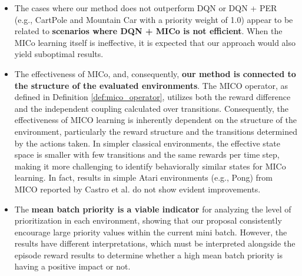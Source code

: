 \begin{itemize}    
    \item The cases where our method does not outperform DQN or DQN + PER (e.g., CartPole and Mountain Car with a priority weight of 1.0) appear to be related to \textbf{scenarios where DQN + MICo is not efficient}. When the MICo learning itself is ineffective, it is expected that our approach would also yield suboptimal results.
    \item The effectiveness of MICo, and, consequently, \textbf{our method is connected to the structure of the evaluated environments}. The MICO operator, as defined in Definition \ref{def:mico_operator}, utilizes both the reward difference and the independent coupling calculated over transitions. Consequently, the effectiveness of MICO learning is inherently dependent on the structure of the environment, particularly the reward structure and the transitions determined by the actions taken. In simpler classical environments, the effective state space is smaller with few transitions and the same rewards per time step, making it more challenging to identify behaviorally similar states for MICo learning.  In fact, results in simple Atari environments (e.g., Pong) from MICO reported by Castro et al. \cite{castro2021mico} do not show evident improvements.
    
    \item The \textbf{mean batch priority is a viable indicator} for analyzing the level of prioritization in each environment, showing that our proposal consistently encourage large priority values within the current mini batch. However, the results have different interpretations, which must be interpreted alongside the episode reward results to determine whether a high mean batch priority is having a positive impact or not.
\end{itemize}